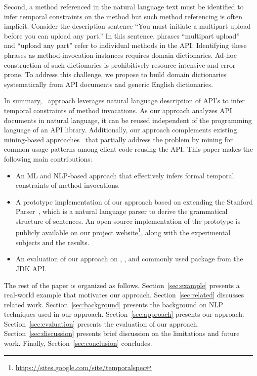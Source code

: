 Second, a method referenced in the natural language text must be identified to infer temporal constraints on the method but such method referencing is often implicit.
Consider the description sentence ``You must initiate a multipart upload before you can upload any part.''
In this sentence, phrases ``multipart upload'' and ``upload any part'' refer to individual methods in the API.
Identifying these phrases as method-invocation instances requires domain dictionaries.
Ad-hoc construction of such dictionaries is prohibitively resource intensive and error-prone.
To address this challenge, we propose to build domain dictionaries systematically from API documents and generic English dictionaries.

In summary, \tool\ approach leverages natural language description of API's to infer temporal constraints of method invocations.
As our approach analyzes API documents in natural language, it can be reused independent of the programming language of an API library.
Additionally, our approach complements existing mining-based approaches~\cite{buse2012synthesizing, thummalapenta07parseweb, Wang:2013:MSR, Zhong:2009:MMR} that partially address the problem by mining for common usage patterns among client code reusing the API.
This paper makes the following main contributions:


\begin{itemize}
	\item An ML and NLP-based approach that effectively infers formal temporal constraints of method invocations. 
	\item A prototype implementation of our approach based on extending the Stanford Parser~\cite{Klein03}, which is a natural language parser to derive the grammatical structure of sentences.
	An open source implementation of the prototype is publicly available on our project website\footnote{\url{https://sites.google.com/site/temporalspec}}, along with the experimental subjects and the results. 
	\item An evaluation of our approach on \amazonAPI, \paypalAPI, and commonly used package  from the JDK API. 
\end{itemize}


The rest of the paper is organized as follows.
Section~\ref{sec:example} presents a real-world example that motivates our approach.
Section~\ref{sec:related} discusses related work.
Section~\ref{sec:background} presents the  background on NLP techniques used in our approach.
Section~\ref{sec:approach} presents our approach.
Section~\ref{sec:evaluation} presents the evaluation of our approach.
Section~\ref{sec:discussion} presents brief discussion on the limitations and future work.
Finally, Section~\ref{sec:conclusion} concludes.

